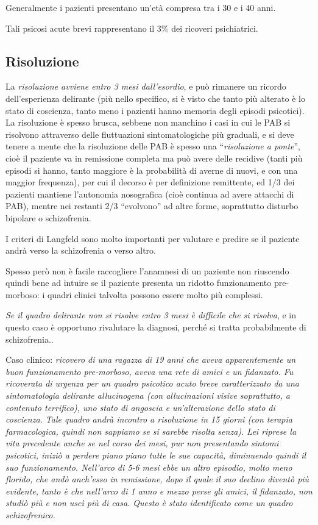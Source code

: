 Generalmente i pazienti presentano un'età compresa tra i 30 e i 40 anni.

Tali psicosi acute brevi rappresentano il 3\% dei ricoveri psichiatrici.

\subsection{Risoluzione}

La \emph{risoluzione avviene entro 3 mesi dall'esordio}, e può rimanere
un ricordo dell'esperienza delirante (più nello specifico, si è visto
che tanto più alterato è lo stato di coscienza, tanto meno i pazienti
hanno memoria degli episodi psicotici). La risoluzione è spesso brusca,
sebbene non manchino i casi in cui le PAB si risolvono attraverso delle
fluttuazioni sintomatologiche più graduali, e si deve tenere a mente che
la risoluzione delle PAB è spesso una ``\emph{risoluzione a ponte}'',
cioè il paziente va in remissione completa ma può avere delle recidive
(tanti più episodi si hanno, tanto maggiore è la probabilità di averne
di nuovi, e con una maggior frequenza), per cui il decorso è per
definizione remittente, ed 1/3 dei pazienti mantiene l'autonomia
nosografica (cioè continua ad avere attacchi di PAB), mentre nei
restanti 2/3 ``evolvono'' ad altre forme, soprattutto disturbo bipolare
o schizofrenia.

I criteri di Langfeld sono molto importanti per valutare e predire se il
paziente andrà verso la schizofrenia o verso altro.

Spesso però non è facile raccogliere l'anamnesi di un paziente non
riuscendo quindi bene ad intuire se il paziente presenta un ridotto
funzionamento pre-morboso: i quadri clinici talvolta possono essere
molto più complessi.

\emph{Se il quadro delirante non si risolve entro 3 mesi è difficile che
si risolva}, e in questo caso è opportuno rivalutare la diagnosi, perché
si tratta probabilmente di schizofrenia..

Caso clinico: \emph{ricovero di una ragazza di 19 anni che aveva
apparentemente un buon funzionamento pre-morboso, aveva una rete di
amici e un fidanzato. Fu ricoverata di urgenza per un quadro psicotico
acuto breve caratterizzato da una sintomatologia delirante allucinogena
(con allucinazioni visive soprattutto, a contenuto terrifico), uno stato
di angoscia e un'alterazione dello stato di coscienza. Tale quadro andrà
incontro a risoluzione in 15 giorni (con terapia farmacologica, quindi
non sappiamo se si sarebbe risolta senza). Lei riprese la vita
precedente anche se nel corso dei mesi, pur non presentando sintomi
psicotici, iniziò a perdere piano piano tutte le sue capacità,
diminuendo quindi il suo funzionamento. Nell'arco di 5-6 mesi ebbe un
altro episodio, molto meno florido, che andò anch'esso in remissione,
dopo il quale il suo declino diventò più evidente, tanto è che nell'arco
di 1 anno e mezzo perse gli amici, il fidanzato, non studiò più e non
uscì più di casa. Questo è stato identificato come un quadro
schizofrenico.}

